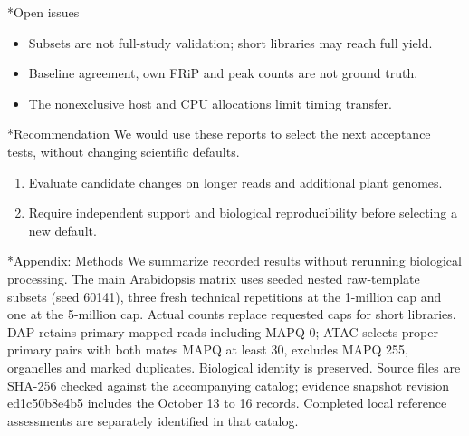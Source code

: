 \documentclass[10pt,letterpaper]{article}
\makeatletter
\renewcommand\section{\@startsection{section}{1}{\z@}{9pt}{4pt}{\large\bfseries}}
\makeatother
\begin{document}
\section*{Open issues}
\begin{itemize}
\item Subsets are not full-study validation; short libraries may reach full yield.
\item Baseline agreement, own FRiP and peak counts are not ground truth.
\item The nonexclusive host and CPU allocations limit timing transfer.
\end{itemize}
\section*{Recommendation}
We would use these reports to select the next acceptance tests, without changing scientific defaults.

\begin{enumerate}
\item Evaluate candidate changes on longer reads and additional plant genomes.
\item Require independent support and biological reproducibility before selecting a new default.
\end{enumerate}
\section*{Appendix: Methods}
We summarize recorded results without rerunning biological processing. The main Arabidopsis matrix uses seeded nested raw-template subsets (seed 60141), three fresh technical repetitions at the 1-million cap and one at the 5-million cap. Actual counts replace requested caps for short libraries. DAP retains primary mapped reads including MAPQ 0; ATAC selects proper primary pairs with both mates MAPQ at least 30, excludes MAPQ 255, organelles and marked duplicates. Biological identity is preserved. Source files are SHA-256 checked against the accompanying catalog; evidence snapshot revision ed1c50b8e4b5 includes the October 13 to 16 records. Completed local reference assessments are separately identified in that catalog.
\end{document}
